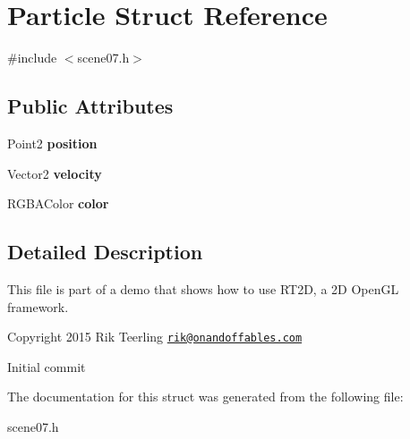 \hypertarget{struct_particle}{}\section{Particle Struct Reference}
\label{struct_particle}


{\ttfamily \#include $<$scene07.\+h$>$}

\subsection*{Public Attributes}
\begin{DoxyCompactItemize}
\item 
\mbox{\label{struct_particle_ad2a9bf68ebead1ca81e96ee1c36294d1}} 
Point2 {\bfseries position}
\item 
\mbox{\label{struct_particle_a37ff3cba1c5971f6933c262cd1c86edf}} 
Vector2 {\bfseries velocity}
\item 
\mbox{\label{struct_particle_af2d78dffc753c7faa80e91ad78c8d867}} 
R\+G\+B\+A\+Color {\bfseries color}
\end{DoxyCompactItemize}


\subsection{Detailed Description}
This file is part of a demo that shows how to use R\+T2D, a 2D Open\+GL framework.


\begin{DoxyItemize}
\item Copyright 2015 Rik Teerling \href{mailto:rik@onandoffables.com}{\tt rik@onandoffables.\+com}
\begin{DoxyItemize}
\item Initial commit 
\end{DoxyItemize}
\end{DoxyItemize}

The documentation for this struct was generated from the following file\+:\begin{DoxyCompactItemize}
\item 
scene07.\+h\end{DoxyCompactItemize}
